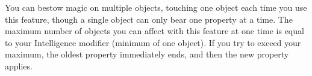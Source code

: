 \documentclass[letterpaper,openany,oneside,twocolumn]{book}
\begin{document}
You can bestow magic on multiple objects, touching one object each time you use this feature, though a single object can only bear one property at a time. The maximum number of objects you can affect with this feature at one time is equal to your Intelligence modifier (minimum of one object). If you try to exceed your maximum, the oldest property immediately ends, and then the new property applies.
%
%
%
%
%
\end{document}
